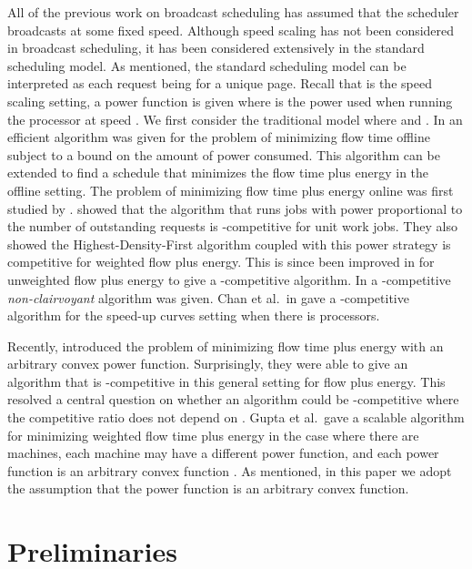 \documentclass[11pt]{article}
\newcommand{\etal}{et al.\ }
\begin{document}
  All of the previous work on broadcast scheduling has assumed that the scheduler broadcasts at some fixed speed. Although speed scaling has not been considered in broadcast scheduling, it has been considered extensively in the standard scheduling model.  As mentioned, the standard scheduling model can be interpreted as each request being for a unique page.  Recall that is the speed scaling setting, a power function  is given where  is the power used when running the processor at speed .    We first consider the traditional model where  and .     In \cite{PruhsUW08} an efficient algorithm was given for  the problem of minimizing flow time offline subject to a bound on the amount of power consumed.  This algorithm can be extended to find a schedule that minimizes the flow time plus energy in the offline setting.  The problem of minimizing flow time plus energy online was first studied by \cite{AlbersF07}.  \cite{BansalPS09} showed that the algorithm that runs jobs with power proportional to the number of outstanding requests is -competitive for unit work jobs.  They also showed the Highest-Density-First algorithm coupled with this power strategy is  competitive for weighted flow plus energy.     This is since been improved in \cite{LamLTW08}  for unweighted flow plus energy to give a -competitive algorithm. In \cite{ChanELLMP09} a -competitive \emph{non-clairvoyant} algorithm was given.  Chan \etal in \cite{ChanEP09} gave a -competitive algorithm for the speed-up curves setting when there is  processors. 

 Recently, \cite{BansalCP09} introduced the problem of minimizing flow time plus energy with an arbitrary convex power function.  Surprisingly, they were able to give an algorithm that is -competitive in this general setting for flow plus energy.  This resolved a central question on whether an algorithm could be -competitive where the competitive ratio does not depend on .   Gupta \etal gave a scalable algorithm for minimizing weighted flow time plus energy in the case where there are  machines, each machine may have a different power function, and each power function is an arbitrary convex function \cite{GuptaKP10}. As mentioned, in this paper we adopt the assumption that the power function is an arbitrary convex function.\ \\





\section{Preliminaries}
\end{document}
